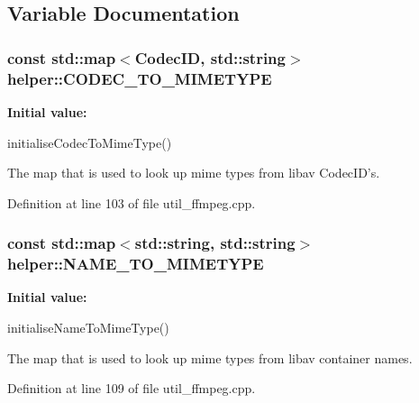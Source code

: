 \subsection{Variable Documentation}
\hypertarget{namespacehelper_af150f7275a50533efd1065e69614c1b7}{
\subsubsection[{CODEC\_\-TO\_\-MIMETYPE}]{\setlength{\rightskip}{0pt plus 5cm}const std::map$<$CodecID, std::string$>$ {\bf helper::CODEC\_\-TO\_\-MIMETYPE}}}
\label{namespacehelper_af150f7275a50533efd1065e69614c1b7}
{\bfseries Initial value:}
\begin{DoxyCode}

        initialiseCodecToMimeType()
\end{DoxyCode}


The map that is used to look up mime types from libav CodecID's. 



Definition at line 103 of file util\_\-ffmpeg.cpp.

\hypertarget{namespacehelper_ac0fdcb6f95d20f10e1ee9e9f8c9bd723}{
\subsubsection[{NAME\_\-TO\_\-MIMETYPE}]{\setlength{\rightskip}{0pt plus 5cm}const std::map$<$std::string, std::string$>$ {\bf helper::NAME\_\-TO\_\-MIMETYPE}}}
\label{namespacehelper_ac0fdcb6f95d20f10e1ee9e9f8c9bd723}
{\bfseries Initial value:}
\begin{DoxyCode}

        initialiseNameToMimeType()
\end{DoxyCode}


The map that is used to look up mime types from libav container names. 



Definition at line 109 of file util\_\-ffmpeg.cpp.

